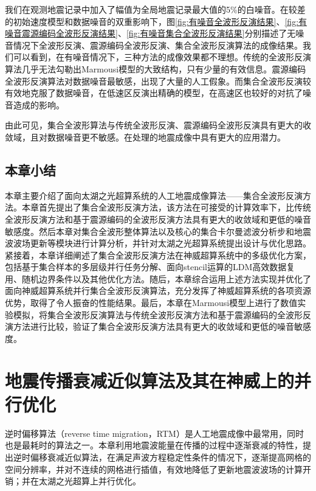 \documentclass[degree=doctor]{thuthesis}
\begin{document}
我们在观测地震记录中加入了幅值为全局地震记录最大值的5\%的白噪音。在较差的初始速度模型和数据噪音的双重影响下，图\ref{fig:有噪音全波形反演结果}、\ref{fig:有噪音震源编码全波形反演结果}、\ref{fig:有噪音集合全波形反演结果}分别描述了无噪音情况下全波形反演、震源编码全波形反演、集合全波形反演算法的成像结果。我们可以看到，在有噪音情况下，三种方法的成像效果都不理想。传统的全波形反演算法几乎无法勾勒出Marmousi模型的大致结构，只有少量的有效信息。震源编码全波形反演算法对数据噪音最敏感，出现了大量的人工假象。而集合全波形反演较有效地克服了数据噪音，在低速区反演出精确的模型，在高速区也较好的对抗了噪音造成的影响。

由此可见，集合全波形算法与传统全波形反演、震源编码全波形反演具有更大的收敛域，且对数据噪音更不敏感。在处理的地震成像中具有更大的应用潜力。


\section{本章小结} %
\label{sec:本章小结}

本章主要介绍了面向太湖之光超算系统的人工地震成像算法——集合全波形反演方法。本章首先提出了集合全波形反演方法，该方法在可接受的计算效率下，比传统全波形反演方法和基于震源编码的全波形反演方法具有更大的收敛域和更低的噪音敏感度。然后本章对集合全波形整体算法以及核心的集合卡尔曼滤波分析步和地震波波场更新等模块进行计算分析，并针对太湖之光超算系统提出设计与优化思路。紧接着，本章详细阐述了集合全波形反演方法在神威超算系统中的多级优化方案，包括基于集合样本的多层级并行任务分解、面向stencil运算的LDM高效数据复用、随机边界条件以及其他优化方法。随后，本章综合运用上述方法实现并优化了面向神威超算系统并行集合全波形反演算法，充分发挥了神威超算系统的各项资源优势，取得了令人振奋的性能结果。最后，本章在Marmousi模型上进行了数值实验模拟，将集合全波形反演算法与传统全波形反演方法和基于震源编码的全波形反演方法进行比较，验证了集合全波形反演方法具有更大的收敛域和更低的噪音敏感度。


\chapter{地震传播衰减近似算法及其在神威上的并行优化}

逆时偏移算法（reverse time migration，RTM）是人工地震成像中最常用，同时也是最耗时的算法之一。本章利用地震波能量在传播的过程中逐渐衰减的特性，提出逆时偏移衰减近似算法，在满足声波方程稳定性条件的情况下，逐渐提高网格的空间分辨率，并对不连续的网格进行插值，有效地降低了更新地震波波场的计算开销；并在太湖之光超算上并行优化。
\end{document}
